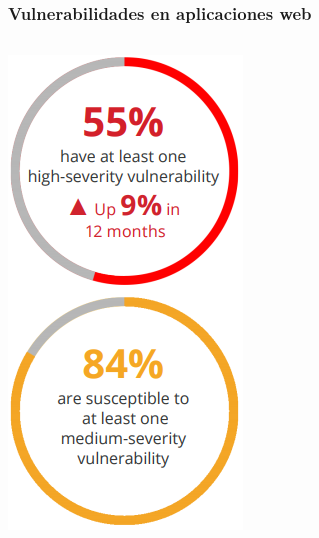 \begin{frame}
    \frametitle{Vulnerabilidades en aplicaciones web}

    \begin{columns}
        \begin{center}
            \includegraphics[width=\textwidth]{images/acunetix_vuln_report.png}
        \end{center}


\end{columns}
\end{frame}
